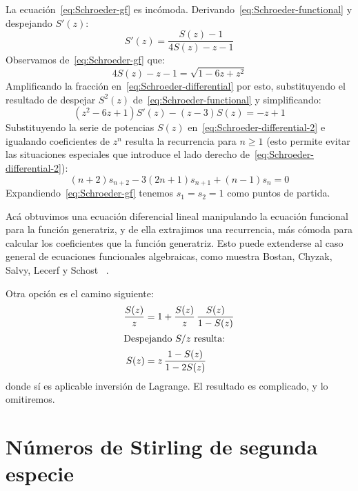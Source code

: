   La ecuación~\eqref{eq:Schroeder-gf} es incómoda.
  Derivando~\eqref{eq:Schroeder-functional}
  y despejando \(S'(z)\):
  \begin{equation}
    \label{eq:Schroeder-differential}
    S'(z)
      = \frac{S(z) - 1}{4 S(z) - z - 1}
  \end{equation}
  Observamos de~\eqref{eq:Schroeder-gf} que:
  \begin{equation*}
    4 S(z) - z - 1
      = \sqrt{1 - 6 z + z^2}
  \end{equation*}
  Amplificando la fracción en~\eqref{eq:Schroeder-differential} por esto,
  substituyendo el resultado de despejar \(S^2(z)\)
  de~\eqref{eq:Schroeder-functional}
  y simplificando:
  \begin{equation}
    \label{eq:Schroeder-differential-2}
    (z^2 - 6 z + 1) S'(z) - (z - 3) S(z)
      = -z + 1
  \end{equation}
  Substituyendo la serie de potencias \(S(z)\)
  en~\eqref{eq:Schroeder-differential-2}
  e igualando coeficientes de \(z^n\)
  resulta la recurrencia para \(n \ge 1\)
  (esto permite evitar las situaciones especiales
   que introduce el lado derecho de~\eqref{eq:Schroeder-differential-2}):
  \begin{equation}
    \label{eq:Schroeder-recurrence}
    (n + 2) s_{n + 2} - 3 (2 n + 1) s_{n + 1} + (n - 1) s_n
      = 0
  \end{equation}
  Expandiendo~\eqref{eq:Schroeder-gf} tenemos \(s_1 = s_2 = 1\)
  como puntos de partida.

  Acá obtuvimos una ecuación diferencial lineal%
  manipulando la ecuación funcional para la función generatriz,
  y de ella extrajimos una recurrencia,
  más cómoda para calcular los coeficientes que la función generatriz.
  Esto puede extenderse
  al caso general de ecuaciones funcionales algebraicas,
  como muestra Bostan, Chyzak, Salvy, Lecerf y Schost~%
    \cite{bostan07:_differ_equat_algeb_funct}.

  Otra opción es el camino siguiente:
  \begin{align*}
    \frac{S(z)}{z}
      &= 1 + \frac{S(z)}{z} \, \frac{S(z)}{1 - S(z)} \\
    \intertext{Despejando \(S / z\) resulta:}
    S(z)
      &= z \, \frac{1 - S(z)}{1 - 2 S(z)}
  \end{align*}
  donde sí es aplicable inversión de Lagrange.
  El resultado es complicado,
  y lo omitiremos.

\section{Números de Stirling de segunda especie}
\label{sec:Stirling-2}

